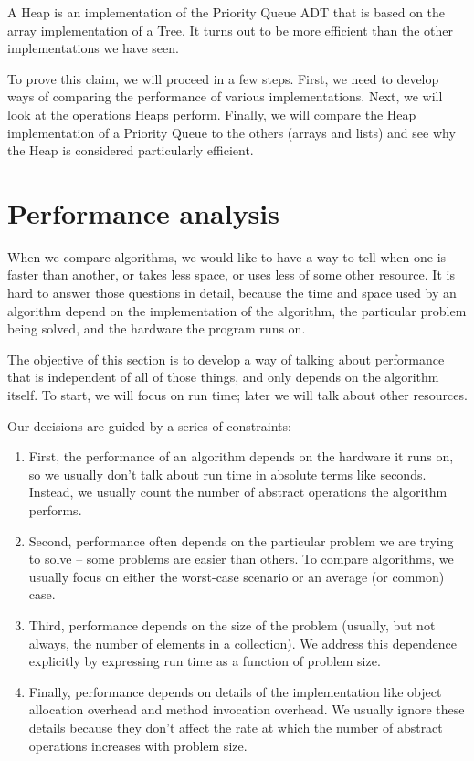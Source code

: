 A Heap is an implementation of the Priority Queue
ADT that is based on the array implementation of a Tree.  It
turns out to be more efficient than the other implementations
we have seen.

To prove this claim, we will proceed in a few steps.
First, we need to develop ways of comparing the performance of
various implementations.  Next, we will look at the operations
Heaps perform.  Finally, we will compare the Heap implementation
of a Priority Queue to the others (arrays and lists) and see
why the Heap is considered particularly efficient.


\section {Performance analysis}

When we compare algorithms, we would like to have a way to tell
when one is faster than another, or takes less space, or uses less
of some other resource.  It is hard to answer those questions in
detail, because the time and space used by an algorithm depend on the
implementation of the algorithm, the particular problem being
solved, and the hardware the program runs on.

The objective of this section is to develop a way of talking about
performance that is independent of all of those things, and only
depends on the algorithm itself.  To start, we will focus on run
time; later we will talk about other resources.

Our decisions are guided by a series of constraints:

\begin{enumerate}

\item First, the performance of an algorithm depends on the
hardware it runs on, so we usually don't talk about run time
in absolute terms like seconds.  Instead, we usually
count the number of abstract operations the algorithm performs.

\item Second, performance often depends on the particular
problem we are trying to solve -- some problems are easier than
others.  To compare algorithms, we usually focus on either the
worst-case scenario or an average (or common) case.

\item Third, performance depends on the size of the problem
(usually, but not always, the number of elements in a collection).
We address this dependence explicitly by
expressing run time as a function of problem size.

\item Finally, performance depends on
details of the implementation like object allocation overhead
and method invocation overhead.  We usually ignore these details
because they don't affect the rate at which the
number of abstract operations increases with problem size.

\end{enumerate}

